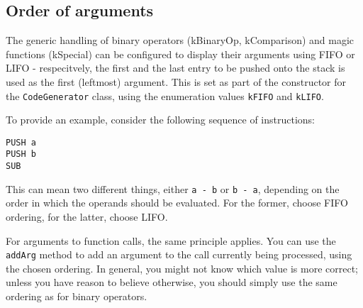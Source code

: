 \subsection{Order of arguments}
\label{sec:argOrder}
The generic handling of binary operators (kBinaryOp, kComparison) and magic functions (kSpecial) can be configured to display their arguments using FIFO or LIFO - respecitvely, the first and the last entry to be pushed onto the stack is used as the first (leftmost) argument. This is set as part of the constructor for the \verb+CodeGenerator+ class, using the enumeration values \verb+kFIFO+ and \verb+kLIFO+.

To provide an example, consider the following sequence of instructions:

\begin{bytecode}
\begin{lstlisting}
PUSH a
PUSH b
SUB
\end{lstlisting}
\end{bytecode}

This can mean two different things, either \verb+a - b+ or \verb+b - a+, depending on the order in which the operands should be evaluated. For the former, choose FIFO ordering, for the latter, choose LIFO.

For arguments to function calls, the same principle applies. You can use the \verb+addArg+ method to add an argument to the call currently being processed, using the chosen ordering. In general, you might not know which value is more correct; unless you have reason to believe otherwise, you should simply use the same ordering as for binary operators.

